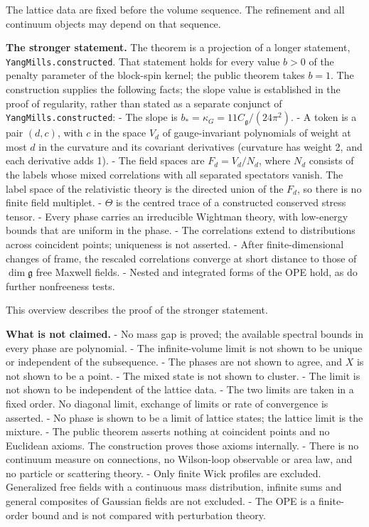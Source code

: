 \documentclass[
  letterpaper,
  11pt]{article}
\begin{document}
The lattice data are fixed before the volume sequence. The refinement
and all continuum objects may depend on that sequence.

\textbf{The stronger statement.} The theorem is a projection of a longer
statement, \texttt{YangMills.constructed}. That statement holds for
every value \(b>0\) of the penalty parameter of the block-spin kernel;
the public theorem takes \(b=1\). The construction supplies the
following facts; the slope value is established in the proof of
regularity, rather than stated as a separate conjunct of
\texttt{YangMills.constructed}: - The slope is
\(b_\ast=\kappa_G=11C_{\mathfrak g}/(24\pi^2)\). - A token is a pair
\((d,c)\), with \(c\) in the space \(V_d\) of gauge-invariant
polynomials of weight at most \(d\) in the curvature and its covariant
derivatives (curvature has weight 2, and each derivative adds 1). - The
field spaces are \(F_d=V_d/N_d\), where \(N_d\) consists of the labels
whose mixed correlations with all separated spectators vanish. The label
space of the relativistic theory is the directed union of the \(F_d\),
so there is no finite field multiplet. - \(\Theta\) is the centred trace
of a constructed conserved stress tensor. - Every phase carries an
irreducible Wightman theory, with low-energy bounds that are uniform in
the phase. - The correlations extend to distributions across coincident
points; uniqueness is not asserted. - After finite-dimensional changes
of frame, the rescaled correlations converge at short distance to those
of \(\dim\mathfrak g\) free Maxwell fields. - Nested and integrated
forms of the OPE hold, as do further nonfreeness tests.

This overview describes the proof of the stronger statement.

\textbf{What is not claimed.} - No mass gap is proved; the available
spectral bounds in every phase are polynomial. - The infinite-volume
limit is not shown to be unique or independent of the subsequence. - The
phases are not shown to agree, and \(X\) is not shown to be a point. -
The mixed state is not shown to cluster. - The limit is not shown to be
independent of the lattice data. - The two limits are taken in a fixed
order. No diagonal limit, exchange of limits or rate of convergence is
asserted. - No phase is shown to be a limit of lattice states; the
lattice limit is the mixture. - The public theorem asserts nothing at
coincident points and no Euclidean axioms. The construction proves those
axioms internally. - There is no continuum measure on connections, no
Wilson-loop observable or area law, and no particle or scattering
theory. - Only finite Wick profiles are excluded. Generalized free
fields with a continuous mass distribution, infinite sums and general
composites of Gaussian fields are not excluded. - The OPE is a
finite-order bound and is not compared with perturbation theory.
\end{document}
